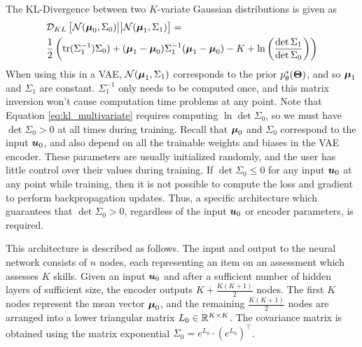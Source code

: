 The KL-Divergence between two $K$-variate Gaussian distributions is given as
\begin{equation}
\begin{split}
  &\mathcal{D}_{KL}\left[\mathcal{N}(\boldsymbol{\mu}_0, \Sigma_0) \big|\big| \mathcal{N}(\boldsymbol{\mu}_1, \Sigma_1) \right] = \\
&\frac{1}{2} \left( \text{tr}(\Sigma_1^{-1}) \Sigma_0) + (\boldsymbol{\mu}_1 - \boldsymbol{\mu}_0) \Sigma_1^{-1} (\boldsymbol{\mu}_1 - \boldsymbol{\mu}_0) - K + \ln\left( \frac{\det \Sigma_1}{\det \Sigma_0 }\right) \right)
  \label{eq:kl_multivariate}
\end{split}
\end{equation}
When using this in a VAE, $\mathcal{N}(\boldsymbol{\mu}_1, \Sigma_1)$ corresponds to the prior $p_\theta^*(\boldsymbol{\Theta})$, and so $\boldsymbol{\mu}_1$ and $\Sigma_1$ are constant. $\Sigma_1^{-1}$ only needs to be computed once, and this matrix inversion won't cause computation time problems at any point. Note that Equation \ref{eq:kl_multivariate} requires computing $\ln \det \Sigma_0$, so we must have $\det \Sigma_0 > 0$ at all times during training. Recall that $\boldsymbol{\mu}_0$ and $\Sigma_0$ correspond to the input $\boldsymbol{u}_0$, and also depend on all the trainable weights and biases in the VAE encoder. These parameters are usually initialized randomly, and the user has little control over their values during training. If $\det \Sigma_0 \leq 0$ for any input $\boldsymbol{u}_0$ at any point while training, then it is not possible to compute the loss and gradient to perform backpropagation updates. Thus, a specific architecture which guarantees that $\det \Sigma_0 > 0$, regardless of the input $\boldsymbol{u}_0$ or encoder parameters, is required.

This architecture is described as follows. The input and output to the neural network consists of $n$ nodes, each representing an item on an assessment which assesses $K$ skills. Given an input $\boldsymbol{u}_0$ and after a sufficient number of hidden layers of sufficient size, the encoder outputs $K + \displaystyle\frac{K(K+1)}{2}$ nodes. The first $K$ nodes represent the mean vector $\boldsymbol{\mu}_0$, and the remaining $\displaystyle\frac{K(K+1)}{2}$ nodes are arranged into a lower triangular matrix $L_0 \in \mathbb{R}^{K\times K}$. The covariance matrix is obtained using the matrix exponential $\Sigma_0 = e^{L_0} \cdot \left( e^{L_0} \right)^\top$.

